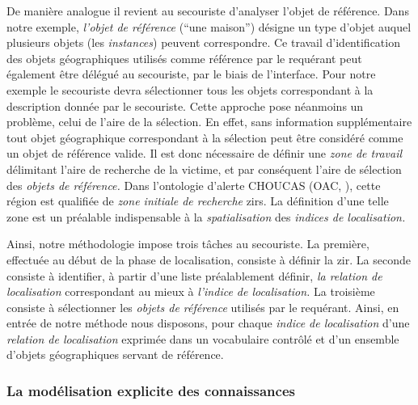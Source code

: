 De manière analogue il revient au secouriste d'analyser l'objet de
référence. Dans notre exemple, \emph{l'objet de référence}
(\enquote{une maison}) désigne un type d'objet auquel plusieurs objets
(\ie les \emph{instances}) peuvent correspondre. Ce travail
d'identification des objets géographiques utilisés comme référence par
le requérant peut également être délégué au secouriste, par le biais
de l'interface. Pour notre exemple le secouriste devra sélectionner
tous les objets correspondant à la description donnée par le
secouriste. Cette approche pose néanmoins un problème, celui de l'aire
de la sélection. En effet, sans information supplémentaire tout objet
géographique correspondant à la sélection peut être considéré comme un
objet de référence valide. Il est donc nécessaire de définir une
\emph{zone de travail} délimitant l'aire de recherche de la victime,
et par conséquent l'aire de sélection des \emph{objets de référence.}
Dans l'ontologie d'alerte CHOUCAS (OAC, \cite{Viry2019}), cette région
est qualifiée de \emph{zone initiale de recherche} \acp{zir}. La
définition d'une telle zone est un préalable indispensable à la
\emph{spatialisation} des \emph{indices de localisation.}

Ainsi, notre méthodologie impose trois tâches au secouriste. La
première, effectuée au début de la phase de localisation, consiste à
définir la \ac{zir}. La seconde consiste à identifier, à partir d'une
liste préalablement définir, \emph{la relation de localisation}
correspondant au mieux à \emph{l'indice de localisation.} La troisième
consiste à sélectionner les \emph{objets de référence} utilisés par le
requérant.
%
Ainsi, en entrée de notre méthode nous disposons, pour chaque
\emph{indice de localisation} d'une \emph{relation de localisation}
exprimée dans un vocabulaire contrôlé et d'un ensemble d'objets
géographiques servant de référence.


\subsubsection{La modélisation explicite des connaissances}

